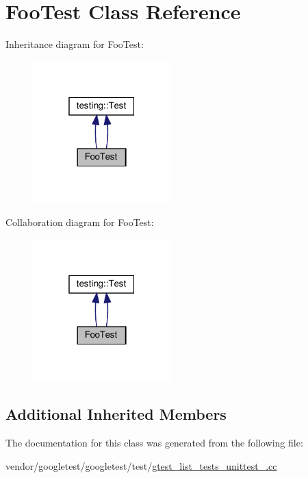 \hypertarget{class_foo_test}{}\section{Foo\+Test Class Reference}
\label{class_foo_test}


Inheritance diagram for Foo\+Test\+:
\nopagebreak
\begin{figure}[H]
\begin{center}
\leavevmode
\includegraphics[width=151pt]{class_foo_test__inherit__graph}
\end{center}
\end{figure}


Collaboration diagram for Foo\+Test\+:
\nopagebreak
\begin{figure}[H]
\begin{center}
\leavevmode
\includegraphics[width=151pt]{class_foo_test__coll__graph}
\end{center}
\end{figure}
\subsection*{Additional Inherited Members}


The documentation for this class was generated from the following file\+:\begin{DoxyCompactItemize}
\item 
vendor/googletest/googletest/test/\hyperlink{gtest__list__tests__unittest___8cc}{gtest\+\_\+list\+\_\+tests\+\_\+unittest\+\_\+.\+cc}\end{DoxyCompactItemize}
